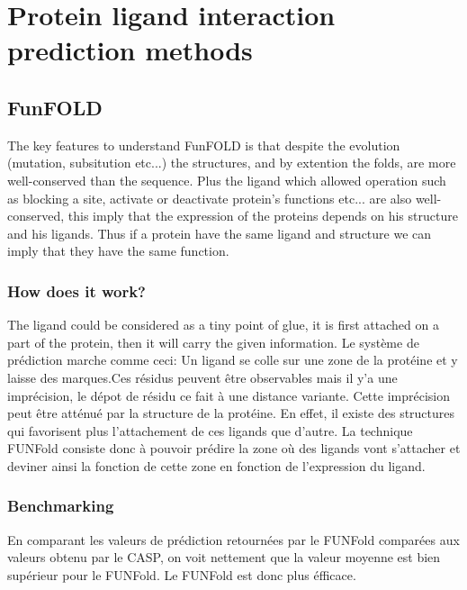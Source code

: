 \section{Protein ligand interaction prediction methods}
\subsection{FunFOLD}
The key features to understand FunFOLD is that despite the evolution (mutation, subsitution etc...) the structures, and by extention the folds, are more well-conserved than the sequence. Plus the ligand which allowed operation such as blocking a site, activate or deactivate protein's functions etc... are also well-conserved, this imply that the expression of the proteins depends on his structure and his ligands. Thus if a protein have the same ligand and structure we can imply that they have the same function.
\newline
\subsubsection{How does it work?}
The ligand could be considered as a tiny point of glue, it is first attached on a part of the protein, then it will carry the given information.
Le système de prédiction marche comme ceci:
\newline
Un ligand se colle sur une zone de la protéine et y laisse des marques.Ces résidus peuvent être observables mais il y'a une imprécision, le dépot de résidu ce fait à une distance variante. Cette imprécision peut être atténué par la structure de la protéine. En effet, il existe des structures qui favorisent plus l'attachement de ces ligands que d'autre. 
\newline
La technique FUNFold consiste donc à pouvoir prédire la zone où des ligands vont s'attacher et deviner ainsi la fonction de cette zone en fonction de l'expression du ligand.
\subsubsection{Benchmarking}
En comparant les valeurs de prédiction retournées par le FUNFold comparées aux valeurs obtenu par le CASP, on voit nettement que la valeur moyenne est bien supérieur pour le FUNFold. Le FUNFold est donc plus éfficace.
